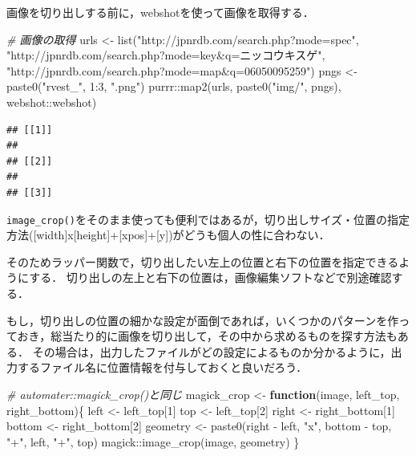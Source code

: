 \documentclass[
]{article}
\newenvironment{Shaded}{\begin{snugshade}}{\end{snugshade}}
\newcommand{\CommentTok}[1]{\textcolor[rgb]{0.56,0.35,0.01}{\textit{#1}}}
\newcommand{\ControlFlowTok}[1]{\textcolor[rgb]{0.13,0.29,0.53}{\textbf{#1}}}
\newcommand{\DecValTok}[1]{\textcolor[rgb]{0.00,0.00,0.81}{#1}}
\newcommand{\FunctionTok}[1]{\textcolor[rgb]{0.00,0.00,0.00}{#1}}
\newcommand{\NormalTok}[1]{#1}
\newcommand{\OtherTok}[1]{\textcolor[rgb]{0.56,0.35,0.01}{#1}}
\newcommand{\SpecialCharTok}[1]{\textcolor[rgb]{0.00,0.00,0.00}{#1}}
\newcommand{\StringTok}[1]{\textcolor[rgb]{0.31,0.60,0.02}{#1}}
\begin{document}
画像を切り出しする前に，webshotを使って画像を取得する．

\begin{Shaded}
\begin{Highlighting}[]
  \CommentTok{\# 画像の取得}
\NormalTok{urls }\OtherTok{\textless{}{-}} 
  \FunctionTok{list}\NormalTok{(}\StringTok{"http://jpnrdb.com/search.php?mode=spec"}\NormalTok{,}
       \StringTok{"http://jpnrdb.com/search.php?mode=key\&q=ニッコウキスゲ"}\NormalTok{,}
       \StringTok{"http://jpnrdb.com/search.php?mode=map\&q=06050095259"}\NormalTok{)}
\NormalTok{pngs }\OtherTok{\textless{}{-}} \FunctionTok{paste0}\NormalTok{(}\StringTok{"rvest\_"}\NormalTok{, }\DecValTok{1}\SpecialCharTok{:}\DecValTok{3}\NormalTok{, }\StringTok{".png"}\NormalTok{)}
\NormalTok{purrr}\SpecialCharTok{::}\FunctionTok{map2}\NormalTok{(urls, }\FunctionTok{paste0}\NormalTok{(}\StringTok{"img/"}\NormalTok{, pngs), webshot}\SpecialCharTok{::}\NormalTok{webshot)}
\end{Highlighting}
\end{Shaded}

\begin{verbatim}
## [[1]]
## 
## [[2]]
## 
## [[3]]
\end{verbatim}

\texttt{image\_crop()}をそのまま使っても便利ではあるが，切り出しサイズ・位置の指定方法({[}width{]}x{[}height{]}+{[}xpos{]}+{[}y{]})がどうも個人の性に合わない．

そのためラッパー関数で，切り出したい左上の位置と右下の位置を指定できるようにする．
切り出しの左上と右下の位置は，画像編集ソフトなどで別途確認する．

もし，切り出しの位置の細かな設定が面倒であれば，いくつかのパターンを作っておき，総当たり的に画像を切り出して，その中から求めるものを探す方法もある．
その場合は，出力したファイルがどの設定によるものか分かるように，出力するファイル名に位置情報を付与しておくと良いだろう．

\begin{Shaded}
\begin{Highlighting}[]
  \CommentTok{\# automater::magick\_crop()と同じ}
\NormalTok{magick\_crop }\OtherTok{\textless{}{-}} \ControlFlowTok{function}\NormalTok{(image, left\_top, right\_bottom)\{}
\NormalTok{  left   }\OtherTok{\textless{}{-}}\NormalTok{ left\_top[}\DecValTok{1}\NormalTok{]}
\NormalTok{  top    }\OtherTok{\textless{}{-}}\NormalTok{ left\_top[}\DecValTok{2}\NormalTok{]}
\NormalTok{  right  }\OtherTok{\textless{}{-}}\NormalTok{ right\_bottom[}\DecValTok{1}\NormalTok{]}
\NormalTok{  bottom }\OtherTok{\textless{}{-}}\NormalTok{ right\_bottom[}\DecValTok{2}\NormalTok{]}
\NormalTok{  geometry }\OtherTok{\textless{}{-}} \FunctionTok{paste0}\NormalTok{(right }\SpecialCharTok{{-}}\NormalTok{ left, }\StringTok{"x"}\NormalTok{, bottom }\SpecialCharTok{{-}}\NormalTok{ top, }\StringTok{"+"}\NormalTok{, left, }\StringTok{"+"}\NormalTok{, top)}
\NormalTok{  magick}\SpecialCharTok{::}\FunctionTok{image\_crop}\NormalTok{(image, geometry)}
\NormalTok{\}}
\end{Highlighting}
\end{Shaded}
\end{document}
